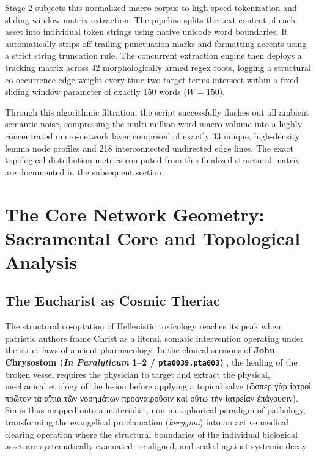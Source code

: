 \documentclass[11pt,twoside,a4paper]{article}
\begin{document}
Stage 2 subjects this normalized macro-corpus to high-speed tokenization and sliding-window matrix extraction. The pipeline splits the text content of each asset into individual token strings using native unicode word boundaries. It automatically strips off trailing punctuation marks and formatting accents using a strict string truncation rule. The concurrent extraction engine then deploys a tracking matrix across 42 morphologically armed regex roots, logging a structural co-occurrence edge weight every time two target terms intersect within a fixed sliding window parameter of exactly 150 words ($W = 150$).

Through this algorithmic filtration, the script successfully flushes out all ambient semantic noise, compressing the multi-million-word macro-volume into a highly concentrated micro-network layer comprised of exactly 33 unique, high-density lemma node profiles and 218 interconnected undirected edge lines. The exact topological distribution metrics computed from this finalized structural matrix are documented in the subsequent section.

\section{The Core Network Geometry: Sacramental Core and Topological Analysis}
\subsection{The Eucharist as Cosmic Theriac}
The structural co-optation of Hellenistic toxicology reaches its peak when patristic authors frame Christ as a literal, somatic intervention operating under the strict laws of ancient pharmacology. In the clinical sermons of \textbf{John Chrysostom (\textit{In Paralyticum} 1--2 / \texttt{pta0039.pta003})} \cite{chrysostom1862pg}, the healing of the broken vessel requires the physician to target and extract the physical, mechanical etiology of the lesion before applying a topical salve (\textgreek{ὥσπερ γὰρ ἰατροὶ πρῶτον τὰ αἴτια τῶν νοσημάτων προαναιροῦσιν καὶ οὕτω τὴν ἰατρείαν ἐπάγουσιν}). Sin is thus mapped onto a materialist, non-metaphorical paradigm of pathology, transforming the evangelical proclamation (\textit{kerygma}) into an active medical clearing operation where the structural boundaries of the individual biological asset are systematically evacuated, re-aligned, and sealed against systemic decay.
\end{document}
